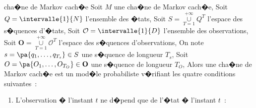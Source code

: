         \begin{xdefinition} {cha�ne de Markov cach�e}
        \label{markov_chaine_cachee_definition}%
        Soit $M$ une cha�ne de Markov cach�e,\newline%
        Soit $Q = \intervalle{1}{N}$ l'ensemble des �tats,\newline%
        Soit $S=\underset{T=1} {\overset{+\infty}{\cup}} Q^T$ l'espace des s�quences d'�tats,\newline%
        Soit $\mathcal{O} = \intervalle{1}{D}$ l'ensemble des observations,\newline%
        Soit $\mathbf{O}=\underset{T=1} {\overset{+\infty}{\cup}} \mathcal{O}^T$ l'espace des s�quences d'observations,\newline%
        On note $s = \pa{q_1,\dots,q_{T_s}} \in S$ une s�quence de longueur $T_s$,\newline%
        Soit $O = \pa{O_1,\dots,O_{T_O}} \in \mathbf{O}$ une s�quence de longueur $T_O$,\newline%
        Alors une cha�ne de Markov cach�e est un mod�le probabiliste v�rifiant les quatre conditions suivantes~:
        
                \begin{enumerate}
                \item L'observation � l'instant $t$ ne d�pend que de l'�tat � l'instant $t$~:
                
                        

\end{enumerate}
\end{xdefinition}

